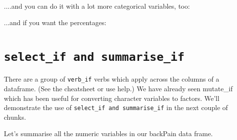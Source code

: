 \documentclass[titlepage]{book}\usepackage{knitr}
\begin{document}
....and you can do it with a lot more categorical variables, too:

\begin{knitrout}
\color{fgcolor}
\end{knitrout}


...and if you want the percentages:
\begin{knitrout}
\color{fgcolor}
\end{knitrout}


\section{\texttt{select\_if and summarise\_if}}

There are a group of \texttt{verb\_if} verbs which apply across the columns of a dataframe. (See the cheatsheet or use help.) We have already seen mutate\_if which has been useful for converting character variables to factors. We'll demonstrate the use of  \texttt{select\_if and summarise\_if} in the next couple of chunks.

Let's summarise all the numeric variables in our backPain data frame.
\end{document}
